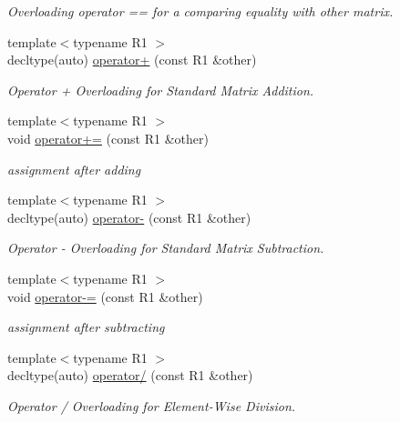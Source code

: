 \begin{DoxyCompactItemize}
\begin{DoxyCompactList}\small\item\em Overloading operator == for a comparing equality with other matrix. \end{DoxyCompactList}\item 
{\footnotesize template$<$typename R1 $>$ }\\decltype(auto) \mbox{\hyperlink{classlazy__matrix_a7c5d07e16aeeadbd2a40e3abee1c9ca3}{operator+}} (const R1 \&other)
\begin{DoxyCompactList}\small\item\em Operator + Overloading for Standard Matrix Addition. \end{DoxyCompactList}\item 
{\footnotesize template$<$typename R1 $>$ }\\void \mbox{\hyperlink{classlazy__matrix_a00cb7c5564344e23ed3c248324993321}{operator+=}} (const R1 \&other)
\begin{DoxyCompactList}\small\item\em assignment after adding \end{DoxyCompactList}\item 
{\footnotesize template$<$typename R1 $>$ }\\decltype(auto) \mbox{\hyperlink{classlazy__matrix_ac0e4bc6ef87afe7ef9b435f2f33878f3}{operator-\/}} (const R1 \&other)
\begin{DoxyCompactList}\small\item\em Operator -\/ Overloading for Standard Matrix Subtraction. \end{DoxyCompactList}\item 
{\footnotesize template$<$typename R1 $>$ }\\void \mbox{\hyperlink{classlazy__matrix_a1115dadbd778a1c2c7e8ad1d0c8a3fd1}{operator-\/=}} (const R1 \&other)
\begin{DoxyCompactList}\small\item\em assignment after subtracting \end{DoxyCompactList}\item 
{\footnotesize template$<$typename R1 $>$ }\\decltype(auto) \mbox{\hyperlink{classlazy__matrix_ada5c981ceba8ec0bd11afdbcb2c40a09}{operator/}} (const R1 \&other)
\begin{DoxyCompactList}\small\item\em Operator / Overloading for Element-\/\+Wise Division. \end{DoxyCompactList}\item 

\end{DoxyCompactItemize}
